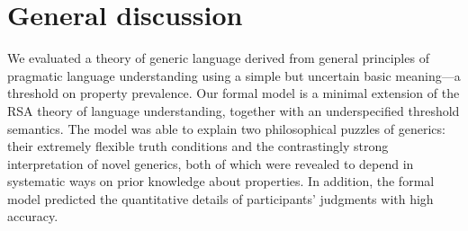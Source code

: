 \documentclass[12pt,letterpaper]{article}
\begin{document}



%

\section*{General discussion}

We evaluated a theory of generic language derived from general principles of pragmatic language understanding using a simple but uncertain basic meaning---a threshold on property prevalence.
Our formal model is a minimal extension of the RSA theory of language understanding, together with an underspecified threshold semantics.
The model was able to explain two philosophical puzzles of generics: their extremely flexible truth conditions and the contrastingly strong interpretation of novel generics, both of which were revealed to depend in systematic ways on prior knowledge about properties. In addition, the formal model predicted the quantitative details of participants' judgments with high accuracy.
\end{document}
